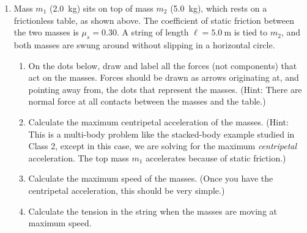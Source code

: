 \begin{enumerate}[itemsep=6pt]
\begin{center}
\end{center}
\item Mass $m_1$ (\SI{2.0}{\kilo\gram}) sits on top of mass $m_2$
  (\SI{5.0}{\kilo\gram}), which rests on a frictionless table, as shown above.
  The coefficient of static friction between the two masses is $\mu_s=0.30$. A
  string of length $\ell=\SI{5.0}\metre$ is tied to $m_2$, and both masses
  are swung around without slipping in a horizontal circle.
  \begin{enumerate}[itemsep=3pt]
  \item On the dots below, draw and label all the forces (not components) that
    act on the masses. Forces should be drawn as arrows originating at, and
    pointing away from, the dots that represent the masses. (Hint: There are
    normal force at all contacts between the masses and the table.)

  \item Calculate the maximum centripetal acceleration of the masses. (Hint:
    This is a multi-body problem like the stacked-body example studied in Class
    2, except in this case, we are solving for the maximum \emph{centripetal}
    acceleration. The top mass $m_1$ accelerates because of static friction.)
    
  \item Calculate the maximum speed of the masses. (Once you have the
    centripetal acceleration, this should be very simple.)
    
  \item Calculate the tension in the string when the masses are moving at
    maximum speed.
  \end{enumerate}


\end{enumerate}
